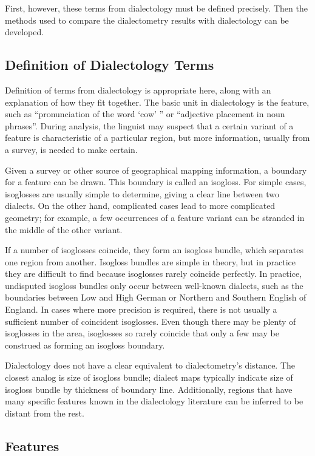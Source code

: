 First, however, these terms from dialectology must be defined
precisely. Then the methods used to compare the dialectometry results
with dialectology can be developed.

\subsection{Definition of Dialectology Terms}

Definition of terms from dialectology is appropriate here, along with
an explanation of how they fit together. The basic unit in
dialectology is the feature, such as ``pronunciation of the word
`cow' '' or ``adjective placement in noun phrases''. During analysis,
the linguist may suspect that a certain variant of a feature is
characteristic of a particular region, but more information, usually
from a survey, is needed to make certain.

Given a survey or other source of geographical mapping information, a
boundary for a feature can be drawn. This boundary is called an
isogloss. For simple cases, isoglosses are usually simple to
determine, giving a clear line between two dialects. On the other
hand, complicated cases lead to more complicated geometry; for
example, a few occurrences of a feature variant
can be stranded in the middle of the other variant.

If a number of isoglosses coincide, they form an isogloss bundle,
which separates one region from another. Isogloss bundles are simple
in theory, but in practice they are difficult to find because
isoglosses rarely coincide perfectly. In practice, undisputed isogloss
bundles only occur between well-known dialects, such as the
boundaries between Low and High German or Northern and Southern
English of England. In cases where more precision is required, there
is not usually a sufficient number of coincident isoglosses. Even
though there may be plenty of isoglosses in the area, isoglosses so
rarely coincide that only a few may be construed as forming an
isogloss boundary.

Dialectology does not have a clear equivalent to dialectometry's
distance. The closest analog is size of isogloss bundle; dialect maps
typically indicate size of isogloss bundle by thickness of boundary
line. Additionally, regions that have many specific features known in the
dialectology literature can be inferred to be distant from the rest.

\subsection{Features}

